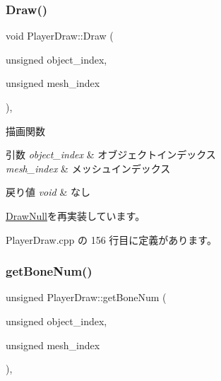\subsubsection{\texorpdfstring{Draw()}{Draw()}}
{\footnotesize\ttfamily void Player\+Draw\+::\+Draw (\begin{DoxyParamCaption}\item[{unsigned}]{object\+\_\+index,  }\item[{unsigned}]{mesh\+\_\+index }\end{DoxyParamCaption})\hspace{0.3cm}{\ttfamily [override]}, {\ttfamily [virtual]}}



描画関数 


\begin{DoxyParams}{引数}
{\em object\+\_\+index} & オブジェクトインデックス \\
\hline
{\em mesh\+\_\+index} & メッシュインデックス \\
\hline
\end{DoxyParams}

\begin{DoxyRetVals}{戻り値}
{\em void} & なし \\
\hline
\end{DoxyRetVals}


\mbox{\hyperlink{class_draw_null_a72ac0b7dc40b1469582419dcc5b0e114}{Draw\+Null}}を再実装しています。



 Player\+Draw.\+cpp の 156 行目に定義があります。

\mbox{\label{class_player_draw_a716aeac1dca9a44c97bc2ea42e55d6f6}} 
\subsubsection{\texorpdfstring{get\+Bone\+Num()}{getBoneNum()}}
{\footnotesize\ttfamily unsigned Player\+Draw\+::get\+Bone\+Num (\begin{DoxyParamCaption}\item[{unsigned}]{object\+\_\+index,  }\item[{unsigned}]{mesh\+\_\+index }\end{DoxyParamCaption})\hspace{0.3cm}{\ttfamily [override]}, {\ttfamily [virtual]}}



